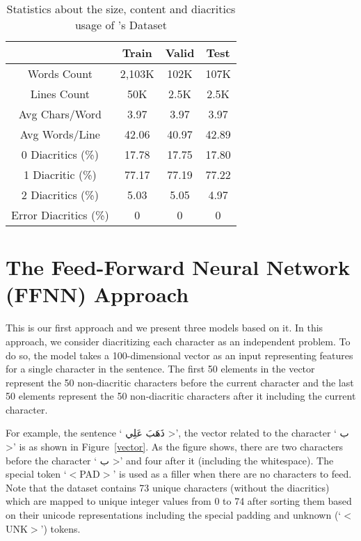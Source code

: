 \documentclass[11pt,a4paper]{article}
\begin{document}
\begin{table}
\centering
\caption{Statistics about the size, content and diacritics usage
of \cite{dataset}'s Dataset}
\label{tab:dataset}
\begin{tabular}{c|c|c|c|}
\cline{2-4}
\multicolumn{1}{l|}{}                   & Train & Valid & Test \\ \hline
\multicolumn{1}{|c|}{Words Count}       & 2,103K   & 102K  & 107K    \\ \hline
\multicolumn{1}{|c|}{Lines Count}       & 50K      & 2.5K  & 2.5K    \\ \hline
\multicolumn{1}{|c|}{Avg Chars/Word}    & 3.97     & 3.97  & 3.97    \\ \hline
\multicolumn{1}{|c|}{Avg Words/Line}    & 42.06    & 40.97 & 42.89   \\ \hline
\multicolumn{1}{|c|}{0 Diacritics (\%)} & 17.78    & 17.75 & 17.80   \\ \hline
\multicolumn{1}{|c|}{1 Diacritic (\%)}  & 77.17    & 77.19 & 77.22   \\ \hline
\multicolumn{1}{|c|}{2 Diacritics (\%)} & 5.03     & 5.05  & 4.97    \\ \hline
\multicolumn{1}{|c|}{Error Diacritics (\%)} & 0 & 0 & 0              \\ \hline
\end{tabular}
\end{table}


\section{The Feed-Forward Neural Network (FFNN) Approach}
\label{sec:ffnn}

This is our first approach and we present three models based on it.
In this approach, we consider diacritizing each character as an independent problem. To do so, the model takes a 100-dimensional vector as an input representing features for a single character in the sentence. The first 50 elements in the vector represent the 50 non-diacritic characters before the current character and the last 50 elements represent the 50 non-diacritic characters after it including the current character.

For example, the sentence `\<
ذَهَبَ عَلِي
>', the vector related to the character
`\<
ب
>'
is as shown in Figure~\ref{vector}.
As the figure shows,
there are two characters before the character
`\<
ب
>'
and four after it (including the whitespace). The special token `$<$PAD$>$' is used as a filler when there are no characters to feed. Note that the dataset contains 73 unique characters (without the diacritics) which are mapped to unique integer values from 0 to 74 after sorting them based on their unicode representations including the special padding and unknown (`$<$UNK$>$') tokens.
\end{document}
